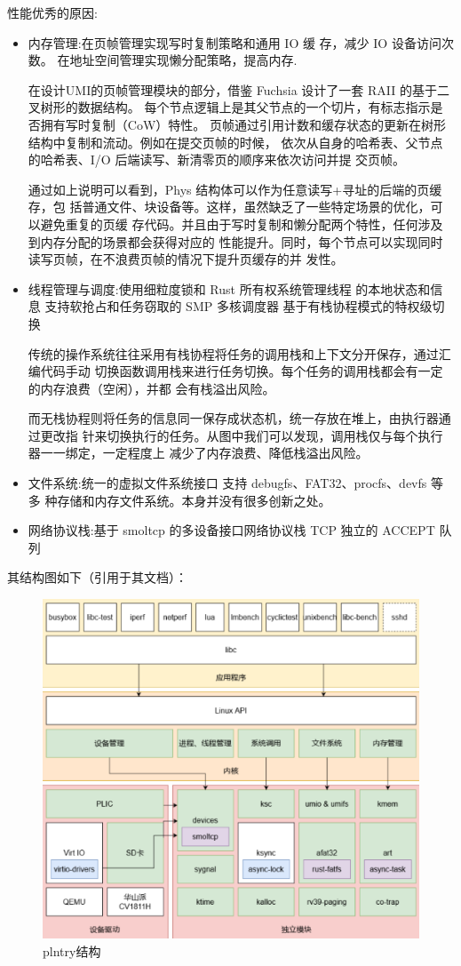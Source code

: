 性能优秀的原因:
\begin{itemize}
    \item 内存管理:在页帧管理实现写时复制策略和通用 IO 缓
存，减少 IO 设备访问次数。
在地址空间管理实现懒分配策略，提高内存.

在设计UMI的页帧管理模块的部分，借鉴 Fuchsia 设计了一套 RAII 的基于二叉树形的数据结构。
每个节点逻辑上是其父节点的一个切片，有标志指示是否拥有写时复制（CoW）特性。
页帧通过引用计数和缓存状态的更新在树形结构中复制和流动。例如在提交页帧的时候，
依次从自身的哈希表、父节点的哈希表、I/O 后端读写、新清零页的顺序来依次访问并提
交页帧。

通过如上说明可以看到，Phys 结构体可以作为任意读写+寻址的后端的页缓存，包
括普通文件、块设备等。这样，虽然缺乏了一些特定场景的优化，可以避免重复的页缓
存代码。并且由于写时复制和懒分配两个特性，任何涉及到内存分配的场景都会获得对应的
性能提升。同时，每个节点可以实现同时读写页帧，在不浪费页帧的情况下提升页缓存的并
发性。
    \item 线程管理与调度:使用细粒度锁和 Rust 所有权系统管理线程
的本地状态和信息
支持软抢占和任务窃取的 SMP 多核调度器
基于有栈协程模式的特权级切换

传统的操作系统往往采用有栈协程将任务的调用栈和上下文分开保存，通过汇编代码手动
切换函数调用栈来进行任务切换。每个任务的调用栈都会有一定的内存浪费（空闲），并都
会有栈溢出风险。

而无栈协程则将任务的信息同一保存成状态机，统一存放在堆上，由执行器通过更改指
针来切换执行的任务。从图中我们可以发现，调用栈仅与每个执行器一一绑定，一定程度上
减少了内存浪费、降低栈溢出风险。

    \item 文件系统:统一的虚拟文件系统接口
支持 debugfs、FAT32、procfs、devfs 等多
种存储和内存文件系统。本身并没有很多创新之处。
    \item 网络协议栈:基于 smoltcp 的多设备接口网络协议栈
TCP 独立的 ACCEPT 队列
\end{itemize}

其结构图如下（引用于其文档）：
\begin{figure}[H]
    \centering
    \includegraphics{figures/10-03-plntry.png}
    \caption{plntry结构}
\end{figure}

